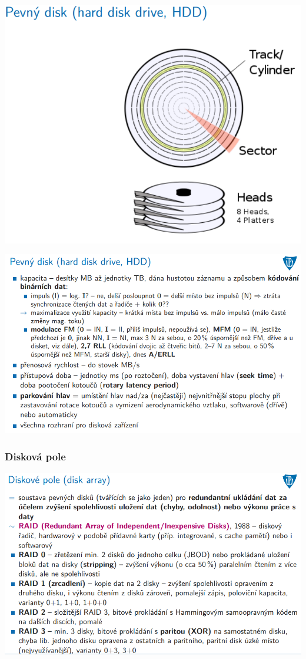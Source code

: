 \documentclass[10pt,a4paper]{article}
\begin{document}
\includegraphics[scale=0.65]{img/prvni_odstavec/otazka6/disk3.png}

\includegraphics[scale=0.65]{img/prvni_odstavec/otazka6/disk4.png}

\subsubsection{Disková pole}
\includegraphics[scale=0.65]{img/prvni_odstavec/otazka6/disk5.png}
\end{document}
